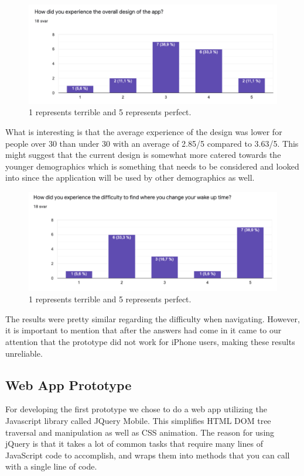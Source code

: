 \documentclass{article}
\begin{document}
\begin{figure}[!h]
  \begin{center}
    \includegraphics[scale=0.6]{Diagram2.png}
    \caption{1 represents terrible and 5 represents perfect.
}
    \label{fig:diagram2}
  \end{center}
\end{figure}

What is interesting is that the average experience of the design was lower for people over 30 than under 30 with an average of 2.85/5 compared to 3.63/5. This might suggest that the current design is somewhat more catered towards the younger demographics which is something that needs to be considered and looked into since the application will be used by other demographics as well. 
\begin{figure}[!h]
  \begin{center}
    \includegraphics[scale=0.6]{Diagram3.png}
    \caption{1 represents terrible and 5 represents perfect.
}
    \label{fig:diagram3}
  \end{center}
\end{figure}

The results were pretty similar regarding the difficulty when navigating. However, it is important to mention that after the answers had come in it came to our attention that the prototype did not work for iPhone users, making these results unreliable.

\subsection{Web App Prototype}
For developing the first prototype we chose to do a web app utilizing the Javascript library called JQuery Mobile. This simplifies HTML DOM tree traversal and manipulation as well as CSS animation. The reason for using jQuery is that it takes a lot of common tasks that require many lines of JavaScript code to accomplish, and wraps them into methods that you can call with a single line of code.\cite{noauthor_11_nodate}
\end{document}
